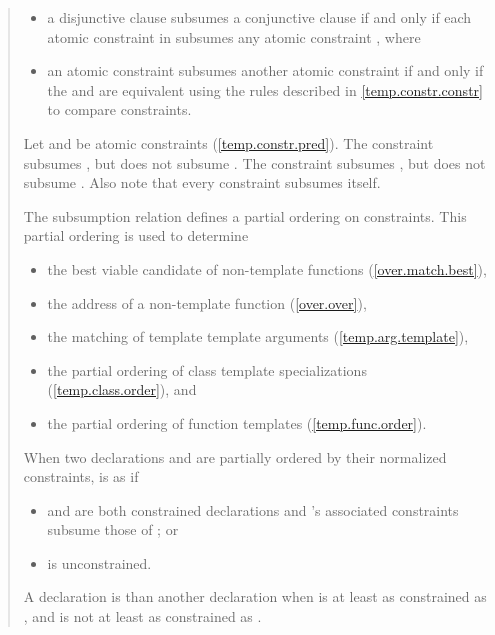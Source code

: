 \begin{quote}
\begin{itemize}
\item a disjunctive clause  subsumes a conjunctive clause
 if and only if each atomic constraint in  subsumes 
any atomic constraint , where

\item an atomic constraint  subsumes another atomic constraint
 if and only if the  and  are equivalent using the
rules described in \ref{temp.constr.constr} to compare constraints.
\end{itemize}
% 
\enterexample
Let  and  be atomic constraints (\ref{temp.constr.pred}).
% 
The constraint  subsumes , 
but  does not subsume . 
% 
The constraint  subsumes , but
 does not subsume . 
% 
Also note that every constraint subsumes itself.
\exitexample


\pnum
The subsumption relation defines a partial ordering on constraints. 
This partial ordering is used to determine
% 
\begin{itemize}
\item the best viable candidate of non-template functions
     (\ref{over.match.best}), 
\item the address of a non-template function
     (\ref{over.over}), 
\item the matching of template template arguments
     (\ref{temp.arg.template}), 
\item the partial ordering of class template specializations
     (\ref{temp.class.order}), and
\item the partial ordering of function templates
     (\ref{temp.func.order}).
\end{itemize}

\pnum
When two declarations  and  are
partially ordered by their normalized constraints,  is 
 as  if
% 
\begin{itemize}
\item {} and  are both constrained declarations and 
's associated constraints subsume those of ; or

\item {} is unconstrained.
\end{itemize}
% 
\pnum
A declaration  is 
than another declaration  when  is at least as
constrained as , and  is not at least as
constrained as .


\end{quote}
